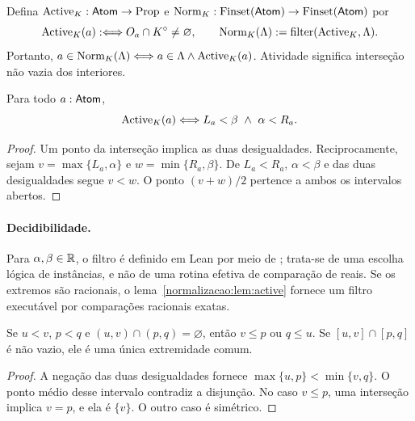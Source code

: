 \begin{definicao}\label{map:normalizacao:3.2}\label{normalizacao:def:norm}
Defina $\operatorname{Active}_K:\mathsf{Atom}\to\mathrm{Prop}$ e
$\operatorname{Norm}_K:\operatorname{Finset}(\mathsf{Atom})\to\operatorname{Finset}(\mathsf{Atom})$ por
\[
 \operatorname{Active}_K(a):\Longleftrightarrow O_a\cap K^\circ\ne\varnothing,
 \qquad \operatorname{Norm}_K(\Lambda):=\operatorname{filter}(\operatorname{Active}_K,\Lambda).
\]
Portanto,
$a\in\operatorname{Norm}_K(\Lambda)\Longleftrightarrow a\in\Lambda\land\operatorname{Active}_K(a)$.
Atividade significa interseção não vazia dos interiores.
\end{definicao}

\begin{lema}\label{map:normalizacao:3.3}\label{normalizacao:lem:active}
Para todo $a:\mathsf{Atom}$,
\[
 \Act_K(a)\Longleftrightarrow L_a<\beta\ \land\ \alpha<R_a.
\]
\end{lema}
\begin{proof}
Um ponto da interseção implica as duas desigualdades. Reciprocamente,
sejam $v=\max\{L_a,\alpha\}$ e $w=\min\{R_a,\beta\}$. De
$L_a<R_a$, $\alpha<\beta$ e das duas desigualdades segue $v<w$.
O ponto $(v+w)/2$ pertence a ambos os intervalos abertos.
\end{proof}

\paragraph{Decidibilidade.}
Para $\alpha,\beta\in\mathbb R$, o filtro é definido em Lean por meio de
; trata-se de uma escolha lógica de
instâncias, e não de uma rotina efetiva de comparação de reais.
Se os extremos são racionais, o lema~\ref{normalizacao:lem:active} fornece um filtro
executável por comparações racionais exatas.

\begin{lema}\label{map:normalizacao:3.4}\label{normalizacao:lem:separated}
Se $u<v$, $p<q$ e $(u,v)\cap(p,q)=\varnothing$, então
$v\le p$ ou $q\le u$. Se $[u,v]\cap[p,q]$ é não vazio, ele é
uma única extremidade comum.
\end{lema}
\begin{proof}
A negação das duas desigualdades fornece
$\max\{u,p\}<\min\{v,q\}$. O ponto médio desse intervalo contradiz a
disjunção. No caso $v\le p$, uma interseção implica $v=p$, e
ela é $\{v\}$. O outro caso é simétrico.
\end{proof}

